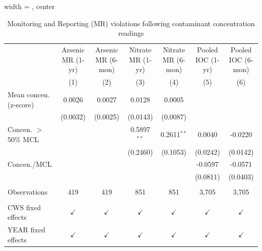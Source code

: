 
\begin{table}[htbp]
\caption{Monitoring and Reporting (MR) violations following contaminant concentration readings}\label{tab:mr_concentration_lag}
\centering
\begin{adjustbox}{width = \textwidth, center}
   \begin{tabular}{lcccccc}
      \toprule    
                                       & Arsenic MR (1-yr) & Arsenic MR (6-mon)  & Nitrate MR (1-yr) & Nitrate MR (6-mon)  & Pooled IOC (1-yr) & Pooled IOC (6-mon) \\   
                                       & (1)               & (2)                 & (3)               & (4)                 & (5)               & (6)\\  
      \midrule 
      Mean concen. (z-score)                    & 0.0026            & 0.0027              & 0.0128            & 0.0005              &                   &   \\   
                                       & (0.0032)          & (0.0025)            & (0.0143)          & (0.0087)            &                   &   \\   
      Concen. $>$ 50\% MCL                        &                   &                     & 0.5897$^{**}$     & 0.2611$^{**}$       & 0.0040            & -0.0220\\   
                                       &                   &                     & (0.2460)          & (0.1053)            & (0.0242)          & (0.0142)\\   
      Concen./MCL                            &                   &                     &                   &                     & -0.0597           & -0.0571\\   
                                       &                   &                     &                   &                     & (0.0811)          & (0.0403)\\   
       \\
      Observations                     & 419               & 419                 & 851               & 851                 & 3,705             & 3,705\\  
       \\
      CWS fixed effects              & $\checkmark$      & $\checkmark$        & $\checkmark$      & $\checkmark$        & $\checkmark$      & $\checkmark$\\   
      YEAR fixed effects               & $\checkmark$      & $\checkmark$        & $\checkmark$      & $\checkmark$        & $\checkmark$      & $\checkmark$\\   

\end{tabular}
\end{adjustbox}
\end{table}
